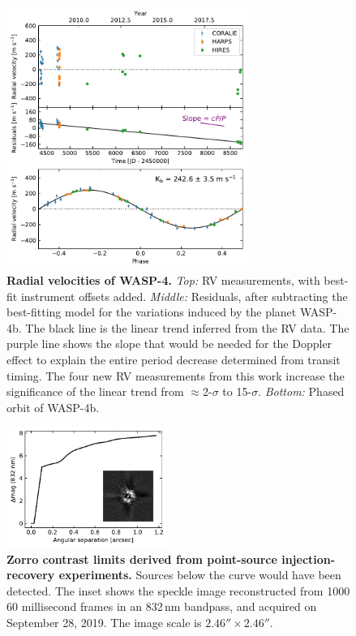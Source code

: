 \documentclass[12pt,twocolumn,tighten]{aastex62}
\begin{document}
\begin{figure}[t]
	\begin{center}
		\leavevmode
		\includegraphics[width=0.7\textwidth]{f2.pdf}
	\end{center}
	\vspace{-0.7cm}
	\caption{
		{\bf Radial velocities of WASP-4.}
		{\it Top:} RV measurements, with best-fit instrument offsets
		added. 
		{\it Middle:}
		Residuals, after subtracting the best-fitting model for the
		variations induced by the planet WASP-4b. The black line is the
		linear trend inferred from the RV data.  The purple line shows the
		slope that would be needed for the Doppler effect to explain the
		entire period decrease determined from transit timing.  The four
		new RV measurements from this work increase the significance of
		the linear trend from $\approx$2-$\sigma$ to 15-$\sigma$.
		{\it Bottom:}
		Phased orbit of WASP-4b.
		\label{fig:rvs}
		\vspace{-0.0cm}
	}
\end{figure}


\begin{figure}[!t]
	\begin{center}
		\leavevmode
		\includegraphics[width=0.47\textwidth]{f3.pdf}
	\end{center}
	\vspace{-0.7cm}
	\caption{
		{\bf Zorro contrast limits derived from point-source
			injection-recovery experiments.} Sources below the curve would
		have been detected.  The inset shows the speckle image
		reconstructed from 1000 60 millisecond frames in an 832$\,$nm
		bandpass, and acquired on September 28, 2019.  The image scale
		is $2.46''\times2.46''$.
	}
	\label{fig:zorro}
\end{figure}
\end{document}
